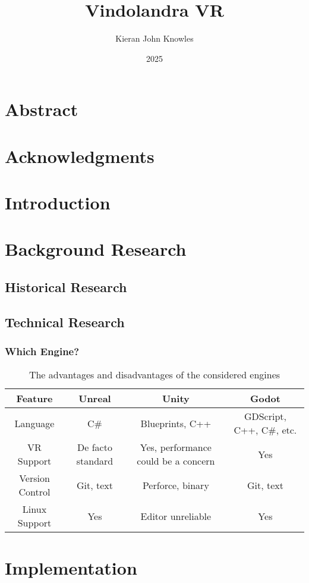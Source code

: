 \documentclass[12pt, a4paper]{report}
\title{Vindolandra VR}
\author{Kieran John Knowles}
\date{2025}
\begin{document}
\maketitle

\chapter*{Abstract}

\chapter*{Acknowledgments}

\tableofcontents
\listoftables
\listoffigures


\chapter{Introduction}

\chapter{Background Research}

\section{Historical Research}

\section{Technical Research}

\subsection{Which Engine?}

\begin{table}
\caption{The advantages and disadvantages of the considered engines}
\begin{tabulary}{\textwidth}{cCCC}\toprule
Feature & Unreal & Unity & Godot \\\midrule

Language & C\# & Blueprints, C++ & GDScript, C++, C\#, etc. \\
VR Support & De facto standard & Yes, performance could be a concern & Yes \\
Version Control & Git, text & Perforce, binary & Git, text \\
Linux Support & Yes & Editor unreliable & Yes \\

\bottomrule\end{tabulary}
\end{table}

\chapter{Implementation}


\todos
\end{document}
